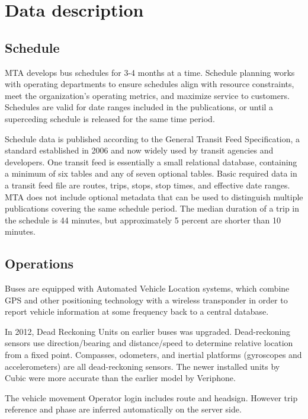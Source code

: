 \documentclass[12pt,journal,compsoc]{IEEEtran}
\begin{document}
\section{Data description}


\subsection{Schedule}

MTA develops bus schedules for 3-4 months at a time.  Schedule planning works with operating departments to ensure schedules align with resource constraints, meet the organization’s operating metrics, and maximize service to customers.  Schedules are valid for date ranges included in the publications, or until a superceding schedule is released for the same time period.

Schedule data is published according to the General Transit Feed Specification, a standard established in 2006 and now widely used by transit agencies and developers.  One transit feed is essentially a small relational database, containing a minimum of six tables and any of seven optional tables.  Basic required data in a transit feed file are routes, trips, stops, stop times, and effective date ranges.  MTA does not include optional metadata that can be used to distinguish multiple publications covering the same schedule period. The median duration of a trip in the schedule is 44 minutes, but approximately 5 percent are shorter than 10 minutes.  

\subsection{Operations}

Buses are equipped with Automated Vehicle Location systems, which combine GPS and other positioning technology with a wireless transponder in order to report vehicle information at some frequency back to a central database.

In 2012, Dead Reckoning Units on earlier buses was upgraded. Dead-reckoning sensors use direction/bearing and distance/speed to determine relative location from a fixed point. Compasses, odometers, and inertial platforms (gyroscopes and accelerometers) are all dead-reckoning sensors.  The newer installed units by Cubic were more accurate than the earlier model by Veriphone.

The vehicle movement Operator login includes route and headsign.  However trip reference and phase are inferred automatically on the server side.
\end{document}
